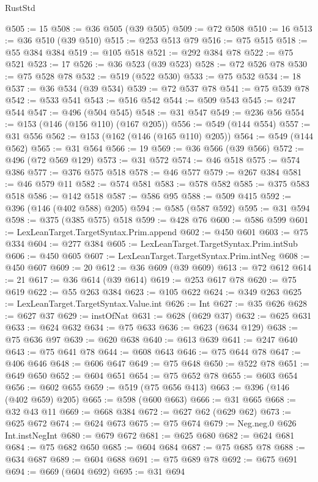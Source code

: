 \begin{lexlean}{RustStd}
\begin{coremodule}
{\begin{coremodule}
{{{{{{{{{{{{{{{{{{{{{{{{{{@505 := 15
@508 := @36 @505 (@39 @505)
@509 := @72 @508
@510 := 16
@513 := @36 @510 (@39 @510)
@515 := @253 @513 @79
@516 := @75 @515
@518 := @55 @384 @384
@519 := @105 @518
@521 := @292 @384 @78
@522 := @75 @521
@523 := 17
@526 := @36 @523 (@39 @523)
@528 := @72 @526 @78
@530 := @75 @528 @78
@532 := @519 (@522 @530)
@533 := @75 @532
@534 := 18
@537 := @36 @534 (@39 @534)
@539 := @72 @537 @78
@541 := @75 @539 @78
@542 := @533 @541
@543 := @516 @542
@544 := @509 @543
@545 := @247 @544
@547 := @496 (@504 @545)
@548 := @31 @547
@549 := @236 @56
@554 := @153 (@146 (@156 @110) (@167 @205))
@556 := @549 (@144 @554)
@557 := @31 @556
@562 := @153 (@162 (@146 (@165 @110) @205))
@564 := @549 (@144 @562)
@565 := @31 @564
@566 := 19
@569 := @36 @566 (@39 @566)
@572 := @496 (@72 @569 @129)
@573 := @31 @572
@574 := @46 @518
@575 := @574 @386
@577 := @376 @575 @518
@578 := @46 @577
@579 := @267 @384
@581 := @46 @579 @11
@582 := @574 @581
@583 := @578 @582
@585 := @375 @583 @518
@586 := @142 @518
@587 := @586 @95
@588 := @509 @415
@592 := @396 (@146 (@402 @588) @205)
@594 := @585 (@587 @592)
@595 := @31 @594
@598 := @375 (@385 @575) @518
@599 := @428 @76
@600 := @586 @599
@601 := LexLeanTarget.TargetSyntax.Prim.append
@602 := @450 @601
@603 := @75 @334
@604 := @277 @384
@605 := LexLeanTarget.TargetSyntax.Prim.intSub
@606 := @450 @605
@607 := LexLeanTarget.TargetSyntax.Prim.intNeg
@608 := @450 @607
@609 := 20
@612 := @36 @609 (@39 @609)
@613 := @72 @612
@614 := 21
@617 := @36 @614 (@39 @614)
@619 := @253 @617 @78
@620 := @75 @619
@622 := @55 @263 @384
@623 := @105 @622
@624 := @349 @263
@625 := LexLeanTarget.TargetSyntax.Value.int
@626 := Int
@627 := @35 @626
@628 := @627 @37
@629 := instOfNat
@631 := @628 (@629 @37)
@632 := @625 @631
@633 := @624 @632
@634 := @75 @633
@636 := @623 (@634 @129)
@638 := @75 @636 @97
@639 := @620 @638
@640 := @613 @639
@641 := @247 @640
@643 := @75 @641 @78
@644 := @608 @643
@646 := @75 @644 @78
@647 := @406 @646
@648 := @606 @647
@649 := @75 @648
@650 := @522 @78
@651 := @649 @650
@652 := @604 @651
@654 := @75 @652 @78
@655 := @603 @654
@656 := @602 @655
@659 := @519 (@75 @656 @413)
@663 := @396 (@146 (@402 @659) @205)
@665 := @598 (@600 @663)
@666 := @31 @665
@668 := @32 @43 @11
@669 := @668 @384
@672 := @627 @62 (@629 @62)
@673 := @625 @672
@674 := @624 @673
@675 := @75 @674
@679 := Neg.neg.{0} @626 Int.instNegInt
@680 := @679 @672
@681 := @625 @680
@682 := @624 @681
@684 := @75 @682 @650
@685 := @604 @684
@687 := @75 @685 @78
@688 := @634 @687
@689 := @604 @688
@691 := @75 @689 @78
@692 := @675 @691
@694 := @669 (@604 @692)
@695 := @31 @694
}}}}}}}}}}}}}}}}}}}}}}}}}}
\end{coremodule}}
\end{coremodule}
\end{lexlean}
